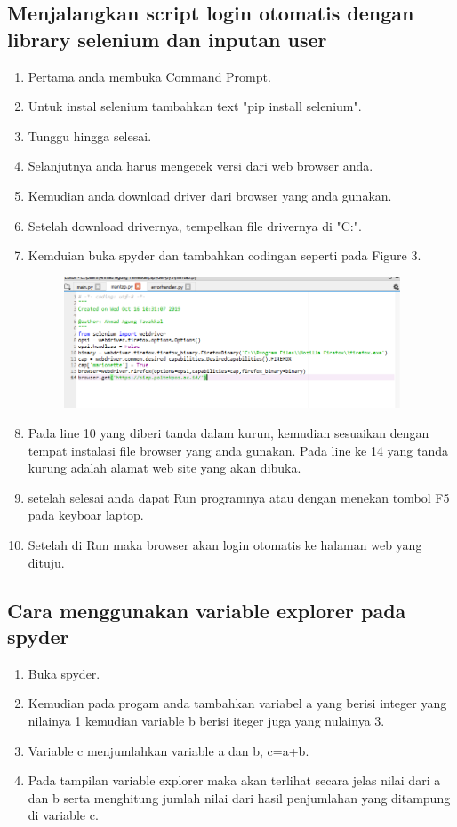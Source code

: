 \documentclass{article}
\begin{document}
\subsection{Menjalangkan script login otomatis dengan library selenium dan inputan user} 
    \begin{enumerate}
        \item Pertama anda membuka Command Prompt.
        \item Untuk instal selenium tambahkan text "pip install selenium".
        \item Tunggu hingga selesai.
        \item Selanjutnya anda harus mengecek versi dari web browser anda.
        \item Kemudian anda download driver dari browser yang anda gunakan.
        \item Setelah download drivernya, tempelkan file drivernya di "C:\Windows{}".
        \item Kemduian buka spyder dan tambahkan codingan seperti pada Figure 3.
            \begin{figure}[H]
                \centerline{\includegraphics[width=10cm]{gambar6.PNG}}
                \caption{}
            \end{figure}
        \item Pada line 10 yang diberi tanda dalam kurun, kemudian sesuaikan dengan tempat instalasi file browser yang anda gunakan. Pada line ke 14 yang tanda kurung adalah alamat web site yang akan dibuka.
        \item setelah selesai anda dapat Run programnya atau dengan menekan tombol F5 pada keyboar laptop.
        \item Setelah di Run maka browser akan login otomatis ke halaman web yang dituju.
    \end{enumerate}

\subsection{Cara menggunakan variable explorer pada spyder}
    \begin{enumerate}
        \item Buka spyder.
        \item Kemudian pada progam anda tambahkan variabel a yang berisi integer yang nilainya 1 kemudian variable b berisi iteger juga yang nulainya 3.
        \item Variable c menjumlahkan variable a dan b, c=a+b.
        \item Pada tampilan variable explorer maka akan terlihat secara jelas nilai dari a dan b serta menghitung jumlah nilai dari hasil penjumlahan yang ditampung di variable c.
    \end{enumerate}
\end{document}
